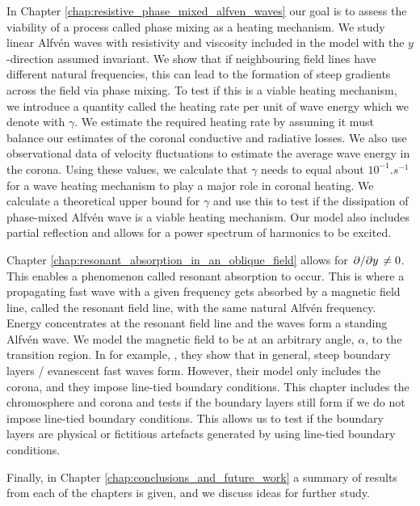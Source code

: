 In Chapter \ref{chap:resistive_phase_mixed_alfven_waves} our goal is to assess the viability of a process called phase mixing as a heating mechanism. We study linear Alfv\'en waves with resistivity and viscosity included in the model with the $y$-direction assumed invariant. We show that if neighbouring field lines have different natural frequencies, this can lead to the formation of steep gradients across the field via phase mixing. To test if this is a viable heating mechanism, we introduce a quantity called the heating rate per unit of wave energy which we denote with $\gamma$. We estimate the required heating rate by assuming it must balance our estimates of the coronal conductive and radiative losses. We also use observational data of velocity fluctuations to estimate the average wave energy in the corona. Using these values, we calculate that $\gamma$ needs to equal about $10^{-1}\si{.s^{-1}}$ for a wave heating mechanism to play a major role in coronal heating. We calculate a theoretical upper bound for $\gamma$ and use this to test if the dissipation of phase-mixed Alfv\'en wave is a viable heating mechanism. Our model also includes partial reflection and allows for a power spectrum of harmonics to be excited.

Chapter \ref{chap:resonant_absorption_in_an_oblique_field} allows for $\pdv*{}{y}\ne0$. This enables a phenomenon called resonant absorption to occur. This is where a propagating fast wave with a given frequency gets absorbed by a magnetic field line, called the resonant field line, with the same natural Alfv\'en frequency. Energy concentrates at the resonant field line and the waves form a standing Alfv\'en wave. We model the magnetic field to be at an arbitrary angle, $\alpha$, to the transition region. In for example, \citet{Halberstadt1993,Halberstadt1995,Arregui2003}, they show that in general, steep boundary layers / evanescent fast waves form. However, their model only includes the corona, and they impose line-tied boundary conditions. This chapter includes the chromosphere and corona and tests if the boundary layers still form if we do not impose line-tied boundary conditions. This allows us to test if the boundary layers are physical or fictitious artefacts generated by using line-tied boundary conditions.

Finally, in Chapter \ref{chap:conclusions_and_future_work} a summary of results from each of the chapters is given, and we discuss ideas for further study.